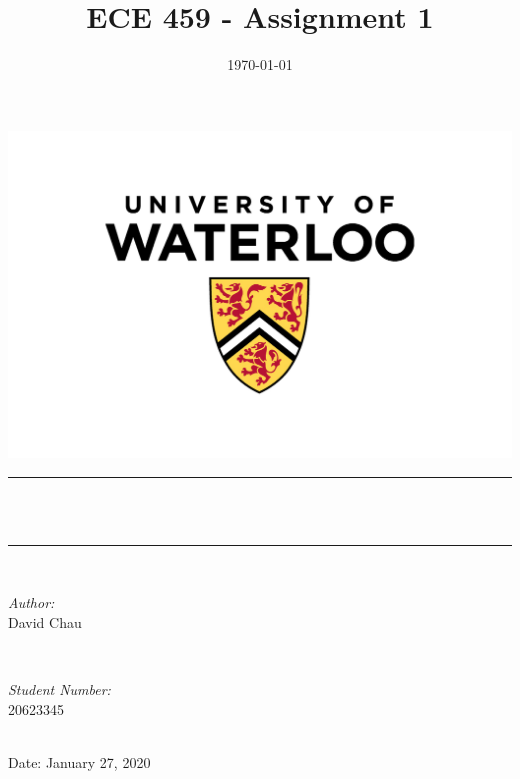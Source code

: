 \documentclass[12pt,reqno]{article}
\title{ECE 459 - Assignment 1} %
\author{}
\date{\today} %
\makeatletter
\let\thetitle\@title
\makeatother
\begin{document}
\newcommand{\units}[1]{$\hspace{0.25em}\mathrm{[#1]}$}


\begin{titlepage}
	\centering
    \vspace*{-1 cm}
    \includegraphics[scale = 0.5]{titlepage/UW.jpg}\\	%
	\rule{\linewidth}{0.2 mm} \\[0.4 cm]
	{ \huge \bfseries \thetitle}\\
	\rule{\linewidth}{0.2 mm} \\[1.5 cm]
	
	\begin{minipage}[t]{0.4\textwidth}
		\begin{flushleft} \large
			\emph{Author:}\\
            David Chau \\
			\end{flushleft}
			\end{minipage}~
			\begin{minipage}[t]{0.4\textwidth}
			\begin{flushright} \large
			\emph{Student Number:} \\
            20623345\\
		\end{flushright}
	\end{minipage}\\[2 cm]
	Date: 
	{\large January 27, 2020}\\[2 cm]
	\vfill
\end{titlepage}
\end{document}

